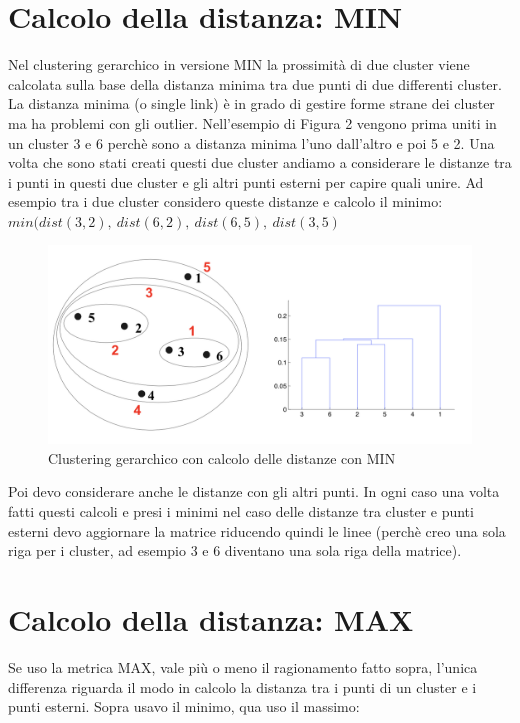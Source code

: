 \documentclass[14pt]{extreport}
\begin{document}
\section{Calcolo della distanza: MIN}

Nel clustering gerarchico in versione MIN la prossimità di due cluster viene calcolata sulla base della distanza minima tra due punti di due differenti cluster.
La distanza minima (o single link) è in grado di gestire forme strane dei cluster ma ha problemi con gli outlier.
Nell'esempio di Figura 2 vengono prima uniti in un cluster 3 e 6 perchè sono a distanza minima l'uno dall'altro e poi 5 e 2.
Una volta che sono stati creati questi due cluster andiamo a considerare le distanze tra i punti in questi due cluster e gli altri punti esterni per capire quali unire.
Ad esempio tra i due cluster considero queste distanze e calcolo il minimo:
$min(dist(3,2), \ dist(6,2), \ dist(6,5), \ dist(3,5)$

\begin{figure}[H]
 \includegraphics[width=\linewidth]{MIN.png}
  \caption{Clustering gerarchico con calcolo delle distanze con MIN}
\end{figure}

Poi devo considerare anche le distanze con gli altri punti. In ogni caso una volta fatti questi calcoli e presi i minimi nel caso delle distanze tra cluster e punti esterni devo aggiornare la matrice riducendo quindi le linee (perchè creo una sola riga per i cluster, ad esempio 3 e 6 diventano una sola riga della matrice).

\section{Calcolo della distanza: MAX}

Se uso la metrica MAX, vale più o meno il ragionamento fatto sopra, l'unica differenza riguarda il modo in calcolo la distanza tra i punti di un cluster e i punti esterni. Sopra usavo il minimo, qua uso il massimo:
\end{document}
